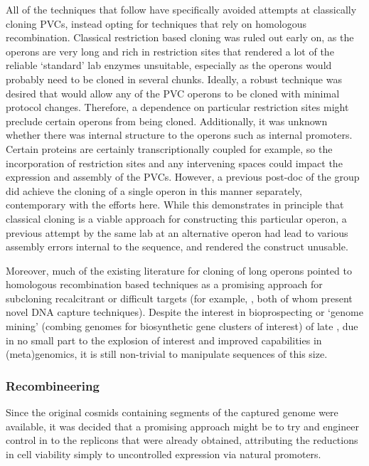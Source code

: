 All of the techniques that follow have specifically avoided attempts at classically cloning PVCs, instead opting for techniques that rely on homologous recombination. Classical restriction based cloning was ruled out early on, as the operons are very long and rich in restriction sites that rendered a lot of the reliable `standard' lab enzymes unsuitable, especially as the operons would probably need to be cloned in several chunks. Ideally, a robust technique was desired that would allow any of the PVC operons to be cloned with minimal protocol changes. Therefore, a dependence on particular restriction sites might preclude certain operons from being cloned. Additionally, it was unknown whether there was internal structure to the operons such as internal promoters. Certain proteins are certainly transcriptionally coupled for example, so the incorporation of restriction sites and any intervening spaces could impact the expression and assembly of the PVCs. However, a previous post-doc of the group did achieve the cloning of a single operon in this manner separately, contemporary with the efforts here. While this demonstrates in principle that classical cloning is a viable approach for constructing this particular operon, a previous attempt by the same lab at an alternative operon had lead to various assembly errors internal to the sequence, and rendered the construct unusable.

Moreover, much of the existing literature for cloning of long operons pointed to homologous recombination based techniques as a promising approach for subcloning recalcitrant or difficult targets (for example, \cite{Wang2016, Garcia2004}, both of whom present novel DNA capture techniques). Despite the interest in bioprospecting or `genome mining' (combing genomes for biosynthetic gene clusters of interest) of late \citep{Ziemert2016, VanLanen2006, Netta2009, Lautru2005, Bergmann2007, Wenzel2009, Charlop-Powers2014}, due in no small part to the explosion of interest and improved capabilities in (meta)genomics, it is still non-trivial to manipulate sequences of this size.

\subsubsection{Recombineering}\label{recombineering}
Since the original cosmids containing segments of the captured genome were available, it was decided that a promising approach might be to try and engineer control in to the replicons that were already obtained, attributing the reductions in cell viability simply to uncontrolled expression via natural promoters.


